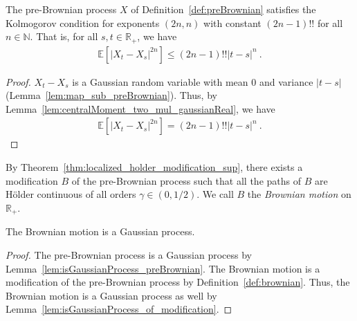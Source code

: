 \begin{lemma}\label{lem:isKolmogorovProcess_preBrownian}
  \leanok
The pre-Brownian process $X$ of Definition~\ref{def:preBrownian} satisfies the Kolmogorov condition for exponents $(2n,n)$ with constant $(2n - 1)!!$ for all $n \in \mathbb{N}$.
That is, for all $s, t \in \mathbb{R}_+$, we have
\begin{align*}
  \mathbb{E} \left[ |X_t - X_s|^{2n} \right] \le (2n - 1)!! |t - s|^n
  \: .
\end{align*}
\end{lemma}

\begin{proof}\leanok
$X_t - X_s$ is a Gaussian random variable with mean $0$ and variance $|t - s|$ (Lemma~\ref{lem:map_sub_preBrownian}).
Thus, by Lemma~\ref{lem:centralMoment_two_mul_gaussianReal}, we have
\begin{align*}
  \mathbb{E} \left[ |X_t - X_s|^{2n} \right]
  = (2n - 1)!! |t - s|^n
  \: .
\end{align*}
\end{proof}


\begin{definition}\label{def:brownian}
  \leanok
By Theorem~\ref{thm:localized_holder_modification_sup}, there exists a modification $B$ of the pre-Brownian process such that all the paths of $B$ are Hölder continuous of all orders $\gamma \in (0, 1/2)$.
We call $B$ the \emph{Brownian motion} on $\mathbb{R}_+$.
\end{definition}


\begin{lemma}\label{lem:isGaussianProcess_brownian}
  \leanok
The Brownian motion is a Gaussian process.
\end{lemma}

\begin{proof}\leanok
The pre-Brownian process is a Gaussian process by Lemma~\ref{lem:isGaussianProcess_preBrownian}.
The Brownian motion is a modification of the pre-Brownian process by Definition~\ref{def:brownian}.
Thus, the Brownian motion is a Gaussian process as well by Lemma~\ref{lem:isGaussianProcess_of_modification}.
\end{proof}


